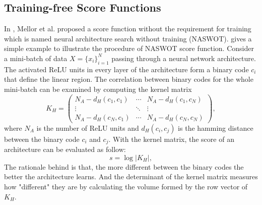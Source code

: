 \documentclass[sigconf]{acmart}
\begin{document}
    \subsection{Training-free Score Functions}
    In \cite{https://doi.org/10.48550/arxiv.2006.04647}, Mellor et al. proposed a 
    score function without the requirement for training which is named neural 
    architecture search without training (NASWOT).  
	gives a simple example to illustrate the procedure of NASWOT score function. 
    Consider a mini-batch of data $X=\{x_i\}^N_{i=1}$ passing through a neural network 
    architecture. The activated ReLU units in every layer of the architecture 
    form a binary code $c_i$ that define the linear region.
    The correlation between binary codes for the whole mini-batch can be examined 
    by computing the kernel matrix 
    \begin{equation}
        K_H=\begin{pmatrix}N_A-d_H(c_1,c_1)&\cdots&N_A-d_H(c_1,c_N)\\\vdots&\ddots&\vdots\\N_A-d_H(c_N,c_1)&\cdots&N_A-d_H(c_N,c_N)\end{pmatrix},
    \end{equation}
    where $N_A$ is the number of ReLU units and $d_H(c_i,c_j)$ is the hamming 
    distance between the binary code $c_i$ and $c_j$. 
    With the kernel matrix, the score of an architecture can be evaluated as 
    follow: 
    \begin{equation}
        s=\log\lvert K_H\rvert,
    \end{equation}
    The rationale behind is that, the more different between the binary codes 
    the better the architecture learns. And the determinant of the kernel matrix 
    measures how "different" they are by calculating the volume formed by the 
    row vector of $K_H$. 
    
	
\end{document}
